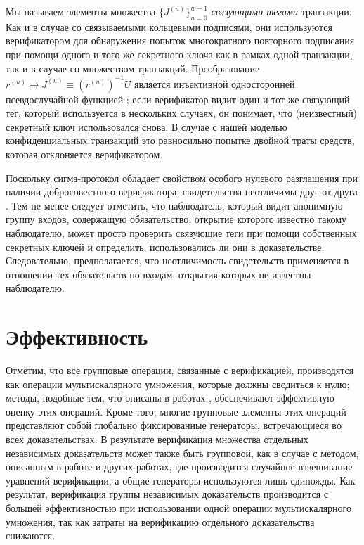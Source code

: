 \documentclass{article}
\theoremstyle{definition}
\begin{document}
Мы называем элементы множества $\{J^{(u)}\}_{u=0}^{w-1}$ \textit{связующими тегами} транзакции.
Как и в случае со связываемыми кольцевыми подписями, они используются верификатором для обнаружения попыток многократного повторного подписания при помощи одного и того же секретного ключа как в рамках одной транзакции, так и в случае со множеством транзакций.
Преобразование $r^{(u)} \mapsto J^{(u)} \equiv (r^{(u)})^{-1}U$ является инъективной односторонней псевдослучайной функцией \cite{dodis}; если верификатор видит один и тот же связующий тег, который используется в нескольких случаях, он понимает, что (неизвестный) секретный ключ использовался снова.
В случае с нашей моделью конфиденциальных транзакций это равносильно попытке двойной траты средств, которая отклоняется верификатором.

Поскольку сигма-протокол обладает свойством  особого нулевого разглашения при наличии добросовестного верификатора, свидетельства неотличимы друг от друга \cite{cramer}.
Тем не менее следует отметить, что наблюдатель, который видит анонимную группу входов, содержащую обязательство, открытие которого известно такому наблюдателю, может просто проверить связующие теги при помощи собственных секретных ключей и определить, использовались ли они в доказательстве.
Следовательно, предполагается, что неотличимость свидетельств применяется в отношении тех обязательств по входам, открытия которых не известны наблюдателю.


\section{Эффективность}
Отметим, что все групповые операции, связанные с верификацией, производятся как операции мультискалярного умножения, которые должны сводиться к нулю; методы, подобные тем, что описаны в работах \cite{straus,pippenger}, обеспечивают эффективную оценку этих операций.
Кроме того, многие групповые элементы этих операций представляют собой глобально фиксированные генераторы, встречающиеся во всех доказательствах.
В результате верификация множества отдельных независимых доказательств может также быть групповой, как в случае с методом, описанным в работе \cite{bulletproofs} и других работах, где производится случайное взвешивание уравнений верификации, а общие генераторы используются лишь единожды.
Как результат, верификация группы независимых доказательств производится с большей эффективностью при использовании одной операции мультискалярного умножения, так как затраты на верификацию отдельного доказательства снижаются.
\end{document}
